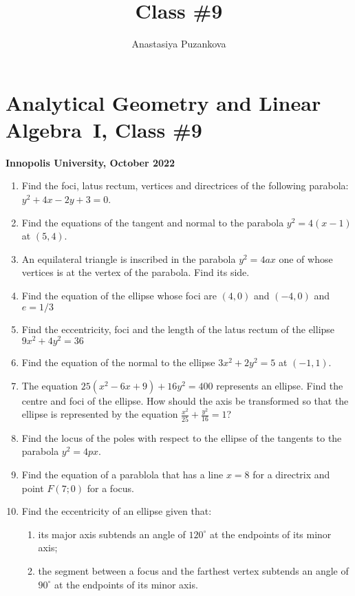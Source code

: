 \documentclass[a4paper,10pt]{article}
\title{Class \#9}
\author{Anastasiya Puzankova}
\date{}
\begin{document}
\section*{Analytical Geometry and Linear Algebra~I, Class \#9}
\noindent\textbf{Innopolis University, October 2022}
\\

\begin{enumerate}

\item %
Find the foci, latus rectum, vertices and directrices of the following parabola: 
$y^2+4x-2y+3=0$.

\item %
Find the equations of the tangent and normal to the parabola $y^2 = 4(x-1)$ at $(5, 4)$.

\item %
An equilateral triangle is inscribed in the parabola $y^2 = 4ax$ one of whose vertices is at the vertex of the parabola. Find its side.

\item %
Find the equation of the ellipse whose foci are $(4, 0)$ and $(-4, 0)$ and $e=1/3$

\item %
Find the eccentricity, foci and the length of the latus rectum of the ellipse 
$9x^2+4y^2=36$

\item %
Find the equation of the normal to the ellipse $3x^2 + 2y^2 = 5$ at $(-1, 1)$.

\item %
The equation $25(x^2 - 6x + 9) + 16y^2 = 400$ represents an ellipse. Find the centre and foci of the ellipse. How should the axis be transformed so that the ellipse is represented by the equation  $\frac{x^2}{25}+\frac{y^2}{16} = 1$?

\item %
Find the locus of the poles with respect to the ellipse of the tangents to the parabola $y^2 = 4px$.
 
\item Find the equation of a parablola that has a line $x=8$ for a directrix and point $F(7;0)$ for a focus.


\item Find the eccentricity of an ellipse given that:\begin{enumerate}
  \item its major axis subtends an angle of $120^\circ$ at the endpoints of its minor axis;
  \item the segment between a focus and the farthest vertex subtends an angle of $90^{\circ}$ at the endpoints of its minor axis.
\end{enumerate}
\end{enumerate}
\end{document}
